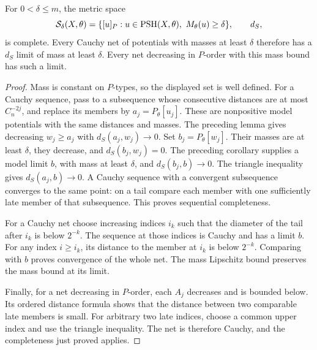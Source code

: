 \begin{theorem}\label{thm:positive-mass-singularity-completeness}
For $0<\delta\leq m$, the metric space
\[
 \mathcal S_\delta(X,\theta)
    =\{[u]_P:u\in\mathrm{PSH}(X,\theta),\ M_\theta(u)\geq\delta\},
                  \qquad d_S,
\]
is complete. Every Cauchy net of potentials with masses at least $\delta$ therefore has a $d_S$ limit of mass at least $\delta$. Every net decreasing in $P$-order with this mass bound has such a limit.
\end{theorem}
\begin{proof}
Mass is constant on $P$-types, so the displayed set is well defined. For a Cauchy sequence, pass to a subsequence whose consecutive distances are at most $C_n^{-2j}$, and replace its members by $a_j=P_\theta[u_j]$. These are nonpositive model potentials with the same distances and masses. The preceding lemma gives decreasing $w_j\geq a_j$ with $d_S(a_j,w_j)\to0$. Set $b_j=P_\theta[w_j]$. Their masses are at least $\delta$, they decrease, and $d_S(b_j,w_j)=0$. The preceding corollary supplies a model limit $b$, with mass at least $\delta$, and $d_S(b_j,b)\to0$. The triangle inequality gives $d_S(a_j,b)\to0$. A Cauchy sequence with a convergent subsequence converges to the same point: on a tail compare each member with one sufficiently late member of that subsequence. This proves sequential completeness.

For a Cauchy net choose increasing indices $i_k$ such that the diameter of the tail after $i_k$ is below $2^{-k}$. The sequence at those indices is Cauchy and has a limit $b$. For any index $i\geq i_k$, its distance to the member at $i_k$ is below $2^{-k}$. Comparing with $b$ proves convergence of the whole net. The mass Lipschitz bound preserves the mass bound at its limit.

Finally, for a net decreasing in $P$-order, each $A_j$ decreases and is bounded below. Its ordered distance formula shows that the distance between two comparable late members is small. For arbitrary two late indices, choose a common upper index and use the triangle inequality. The net is therefore Cauchy, and the completeness just proved applies.
\end{proof}

